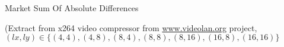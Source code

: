 %
\begin{Frame}{Market Sum Of Absolute Differences}


(Extract from x264 video compressor from \url{www.videolan.org}
project, $(lx, ly) \in \{(4, 4), (4, 8), (8, 4), (8, 8), (8,16), (16,8), (16,16)\}$
\end{Frame}


